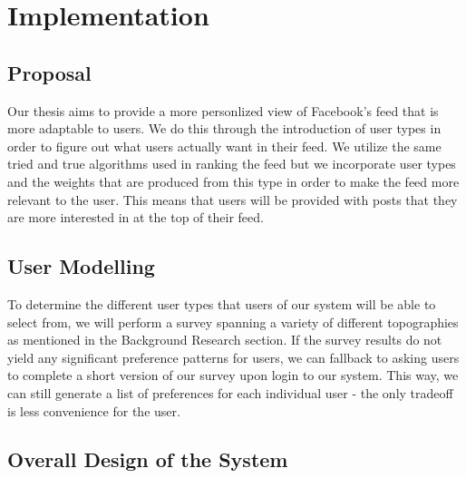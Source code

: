 
\chapter{Implementation}\label{ch:implementation}

\section{Proposal}

Our thesis aims to provide a more personlized view of Facebook's feed that is more adaptable to users. We do this through the introduction of user types in order to figure out what users actually want in their feed. We utilize the same tried and true algorithms used in ranking the feed but we incorporate user types and the weights that are produced from this type in order to make the feed more relevant to the user. This means that users will be provided with posts that they are more interested in at the top of their feed. 

\section{User Modelling}

To determine the different user types that users of our system will be able to select from, we will perform a survey spanning a variety of different topographies as mentioned in the Background Research section. If the survey results do not yield any significant preference patterns for users, we can fallback to asking users to complete a short version of our survey upon login to our system. This way, we can still generate a list of preferences for each individual user - the only tradeoff is less convenience for the user.

\section{Overall Design of the System}


